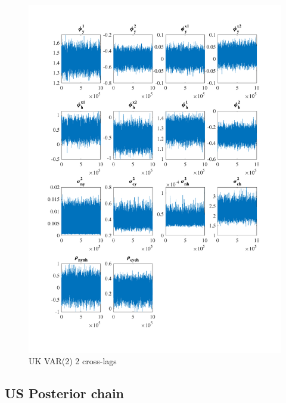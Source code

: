\documentclass[
  12pt,
]{article}
\begin{document}
\begin{figure}

{\centering \includegraphics[width=0.85\linewidth]{../../Regression/Bayesian_UC_VAR2_drift_Crosscycle2lags/OutputData/posteriorchain_UK} 

}

\caption{UK VAR(2) 2 cross-lags}\label{fig:unnamed-chunk-17}
\end{figure}

\clearpage

\hypertarget{us-posterior-chain}{%
\subsection{US Posterior chain}\label{us-posterior-chain}}
\end{document}
